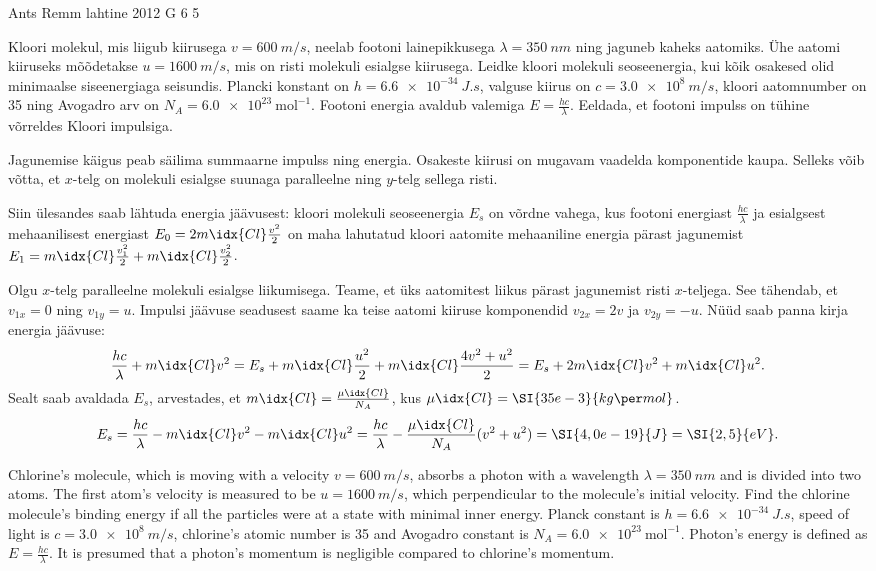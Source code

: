{Ants Remm} %
{lahtine} %
{2012} %
{G 6} %
{5} %
{
\ifStatement
Kloori molekul, mis liigub kiirusega $v = \SI{600}{m/s}$, neelab
footoni lainepikkusega $\lambda = \SI{350}{nm}$ ning jaguneb kaheks aatomiks.
Ühe aatomi kiiruseks
mõõdetakse $ u = \SI{1600}{m/s}$, mis on risti molekuli esialgse
kiirusega. Leidke kloori molekuli seoseenergia, kui kõik osakesed olid
minimaalse siseenergiaga seisundis.  Plancki konstant on $h =
\SI{6,6e-34}{J.s}$, valguse kiirus on $c = \SI{3,0e8}{m/s}$, kloori aatomnumber on 35 ning Avogadro arv on $N_A
= \SI{6,0e23}{\text{mol}^{-1}}$. Footoni energia avaldub valemiga $E =
\frac{h c}{\lambda}$. Eeldada, et footoni impulss on tühine võrreldes Kloori impulsiga.
\fi


\ifHint
Jagunemise käigus peab säilima summaarne impulss ning energia. Osakeste kiirusi on mugavam vaadelda komponentide kaupa. Selleks võib võtta, et $x$-telg on molekuli esialgse suunaga paralleelne ning $y$-telg sellega risti.
\fi


\ifSolution
Siin ülesandes saab lähtuda energia jäävusest: kloori molekuli seoseenergia $E_s$ on võrdne vahega, kus footoni energiast $\frac{hc}{\lambda}$ ja esialgsest mehaanilisest energiast $E_0 = 2m\idx{Cl} \frac{v^2}{2} $ on maha lahutatud kloori aatomite mehaaniline energia pärast jagunemist $E_1 = m\idx{Cl} \frac{v_1^2}{2} + m\idx{Cl} \frac{v_2^2}{2}$.

Olgu $x$-telg paralleelne molekuli esialgse liikumisega. Teame, et üks aatomitest liikus pärast jagunemist risti $x$-teljega. See tähendab, et $v_{1x} = 0$ ning $v_{1y} = u$. Impulsi jäävuse seadusest saame ka teise aatomi kiiruse komponendid $v_{2x} = 2 v$ ja $v_{2y} = -u$.  Nüüd saab panna kirja energia jäävuse:
$$
	\frac{hc}{\lambda} + m\idx{Cl} v^2  = E_s + m\idx{Cl} \frac{u^2}{2} + m\idx{Cl} \frac{4v^2 + u^2}{2} = E_s + 2 m\idx{Cl} v^2 + m\idx{Cl} u^2.
$$
Sealt saab avaldada $E_s$, arvestades, et $m\idx{Cl} = \frac{\mu\idx{Cl}}{N_A}$, kus $\mu\idx{Cl} = \SI{35e-3}{kg\per mol}$.
$$ E_s = \frac{hc}{\lambda} - m\idx{Cl} v^2 - m\idx{Cl} u^2 = \frac{hc}{\lambda} - \frac{\mu\idx{Cl}}{N_A} (v^2 + u^2) = \SI{4,0e-19}{J} = \SI{2,5}{eV}.
$$
\fi


\ifEngStatement
Chlorine’s molecule, which is moving with a velocity $v = \SI{600}{m/s}$, absorbs a photon with a wavelength $\lambda = \SI{350}{nm}$ and is divided into two atoms. The first atom’s velocity is measured to be $ u = \SI{1600}{m/s}$, which perpendicular to the molecule’s initial velocity. Find the chlorine molecule’s binding energy if all the particles were at a state with minimal inner energy. Planck constant is $h =
\SI{6,6e-34}{J.s}$, speed of light is $c = \SI{3,0e8}{m/s}$, chlorine’s atomic number is 35 and Avogadro constant is $N_A
= \SI{6,0e23}{\text{mol}^{-1}}$. Photon’s energy is defined as $E =
\frac{h c}{\lambda}$. It is presumed that a photon’s momentum is negligible compared to chlorine’s momentum.
\fi


}
